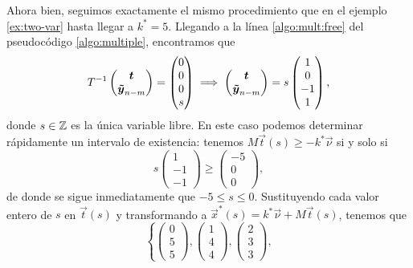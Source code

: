 \begin{example}
	Ahora bien, seguimos exactamente el mismo procedimiento que en el ejemplo \ref{ex:two-var} hasta
	llegar a $k^* = 5$. Llegando a la línea \ref{algo:mult:free} del pseudocódigo
	\ref{algo:multiple}, encontramos que
	\begin{equation*}
		T^{-1} \begin{pmatrix} \boldsymbol{t} \\ \boldsymbol{\tilde{y}}_{n-m} \end{pmatrix}
		=
		\begin{pmatrix} 0 \\ 0 \\ 0 \\ s \end{pmatrix}
		\implies
		\begin{pmatrix} \boldsymbol{t} \\ \boldsymbol{\tilde{y}}_{n-m} \end{pmatrix}
		=
		s \begin{pmatrix} 1 \\ 0 \\ -1 \\ 1 \end{pmatrix},
	\end{equation*}
	donde $s \in \mathbb{Z}$ es la única variable libre. En este caso podemos determinar rápidamente un
	intervalo de existencia: tenemos $M\vec{t}(s) \geq -k^*\vec{\nu}$ si y solo si
	\begin{equation*}
		s\begin{pmatrix} 1 \\ -1 \\ -1 \end{pmatrix} \geq
		\begin{pmatrix} -5 \\ 0 \\ 0 \end{pmatrix},
	\end{equation*}
	de donde se sigue inmediatamente que $-5 \leq s \leq 0$. Sustituyendo
	cada valor entero de $s$ en $\vec{t}(s)$ y transformando a $\vec{x}^*(s) = k^*\vec{\nu} +
	M\vec{t}(s)$, tenemos que
	\begin{equation*}
		\left\lbrace
			\begin{pmatrix} 0 \\ 5 \\ 5 \end{pmatrix},
			\begin{pmatrix} 1 \\ 4 \\ 4 \end{pmatrix},
			\begin{pmatrix} 2 \\ 3 \\ 3 \end{pmatrix},

\end{equation*}
\end{example}
